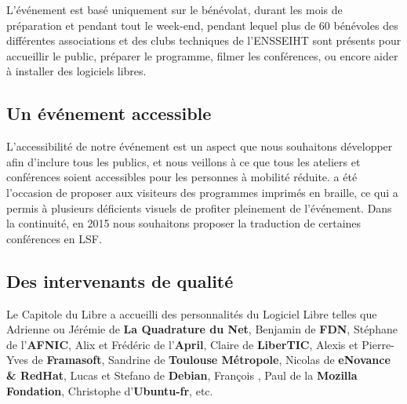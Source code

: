 \Separateur

L'événement est basé uniquement sur le bénévolat, durant les mois 
de préparation et pendant tout le week-end, pendant lequel plus de 60 
bénévoles des différentes associations et des clubs techniques de l'ENSSEIHT
sont présents pour accueillir le public, préparer le 
programme, filmer les conférences, ou encore aider à installer des 
logiciels libres.

\subsection{Un événement accessible}

\begin{minipage}{0.38\textwidth}
\begin{center}
\end{center}
\end{minipage}
\begin{minipage}{0.62\textwidth}
L'accessibilité de notre événement est un aspect que nous souhaitons 
développer afin d'inclure tous les publics, et nous veillons à ce que 
tous les ateliers et conférences soient accessibles pour les personnes 
à mobilité réduite.
 a été l'occasion de proposer aux visiteurs des programmes 
imprimés en braille, ce qui a permis à plusieurs déficients visuels 
de profiter pleinement de l'événement. Dans la continuité, en 2015 
nous souhaitons proposer la traduction de certaines conférences en LSF.
\end{minipage}

\newpage

\subsection{Des intervenants de qualité}

Le Capitole du Libre a accueilli des personnalités du Logiciel Libre telles que Adrienne  ou Jérémie  de \textbf{La Quadrature du Net}, Benjamin  de \textbf{FDN}, Stéphane  de l'\textbf{AFNIC}, Alix  et Frédéric  de l'\textbf{April}, Claire  de \textbf{LiberTIC}, Alexis  et Pierre-Yves  de \textbf{Framasoft}, Sandrine  de \textbf{Toulouse Métropole}, Nicolas  de \textbf{eNovance \& RedHat}, Lucas  et Stefano  de \textbf{Debian}, François , Paul  de la \textbf{Mozilla Fondation}, Christophe  d'\textbf{Ubuntu-fr}, etc.

